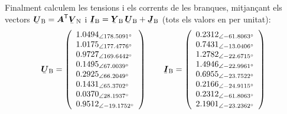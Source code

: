 \begin{exemple}
    Finalment calculem les tensions i els corrents de les branques,
    mitjançant els vectors $\mcmplx{U}\ped{B} = \transp{\boldsymbol{A}}
    \mcmplx{V}\ped{N}$ i $\mcmplx{I}\ped{B} =  \mcmplx{Y}\ped{B}\,
    \mcmplx{U}\ped{B} + \mcmplx{J}\ped{B}$ (tots els valors en per unitat):
    \[
       \mcmplx{U}\ped{B} =
       \left(\begin{array}{l}
         \numpd{1,0494}{ 178,5091} \\
         \numpd{1,0175}{ 177,4776} \\
         \numpd{0,9727}{ 169,6442} \\
         \numpd{0,1495}{  67,0039} \\
         \numpd{0,2925}{  66,2049} \\
         \numpd{0,1431}{  65,3702} \\
         \numpd{0,0370}{  28,1937} \\
         \numpd{0,9512}{ -19,1752}
       \end{array}\right)
       \qquad
       \mcmplx{I}\ped{B} =
       \left(\begin{array}{l}
         \numpd{0,2312}{-61,8063} \\
         \numpd{0,7431}{-13,0406} \\
         \numpd{1,2782}{-22,6715} \\
         \numpd{1,4946}{-22,9961} \\
         \numpd{0,6955}{-23,7522} \\
         \numpd{0,2166}{-24,9115} \\
         \numpd{0,2312}{-61,8063} \\
         \numpd{2,1901}{-23,2362}
       \end{array}\right)
    \]


\end{exemple}
